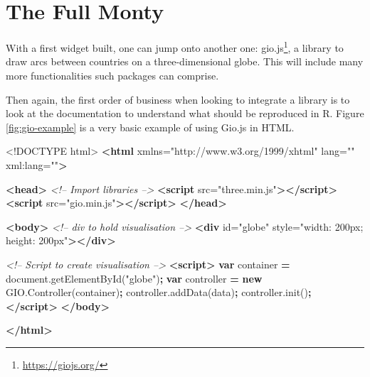 \documentclass[10pt,]{krantz}
\makeatletter
\newenvironment{Shaded}{\begin{snugshade}}{\end{snugshade}}
\newcommand{\AttributeTok}[1]{\textcolor[rgb]{0.61,0.61,0.61}{#1}}
\newcommand{\CommentTok}[1]{\textcolor[rgb]{0.37,0.37,0.37}{\textit{#1}}}
\newcommand{\DataTypeTok}[1]{\textcolor[rgb]{0.27,0.27,0.27}{#1}}
\newcommand{\KeywordTok}[1]{\textcolor[rgb]{0.27,0.27,0.27}{\textbf{#1}}}
\newcommand{\NormalTok}[1]{#1}
\newcommand{\OperatorTok}[1]{\textcolor[rgb]{0.43,0.43,0.43}{\textbf{#1}}}
\newcommand{\OtherTok}[1]{\textcolor[rgb]{0.37,0.37,0.37}{#1}}
\newcommand{\StringTok}[1]{\textcolor[rgb]{0.5,0.5,0.5}{#1}}
\newcommand{\VariableTok}[1]{\textcolor[rgb]{0,0,0}{#1}}
\renewcommand{\href}[2]{#2\footnote{\url{#1}}}
\newenvironment{kframe}{%
\medskip{}
\setlength{\fboxsep}{.8em}
 \def\at@end@of@kframe{}%
 \ifinner\ifhmode%
  \def\at@end@of@kframe{\end{minipage}}%
  \begin{minipage}{\columnwidth}%
 \fi\fi%
 \def\FrameCommand##1{\hskip\@totalleftmargin \hskip-\fboxsep
 \colorbox{shadecolor}{##1}\hskip-\fboxsep
     \hskip-\linewidth \hskip-\@totalleftmargin \hskip\columnwidth}%
 \MakeFramed {\advance\hsize-\width
   \@totalleftmargin\z@ \linewidth\hsize
   \@setminipage}}%
 {\par\unskip\endMakeFramed%
 \at@end@of@kframe}
\renewenvironment{Shaded}{\begin{kframe}}{\end{kframe}}
\makeatother
\begin{document}
\hypertarget{widgets-full}{%
\chapter{The Full Monty}\label{widgets-full}}

With a first widget built, one can jump onto another one: \href{https://giojs.org/}{gio.js}, a library to draw arcs between countries on a three-dimensional globe. This will include many more functionalities such packages can comprise.

Then again, the first order of business when looking to integrate a library is to look at the documentation to understand what should be reproduced in R. Figure \ref{fig:gio-example} is a very basic example of using Gio.js in HTML.

\begin{Shaded}
\begin{Highlighting}[]
\DataTypeTok{<!DOCTYPE }\NormalTok{html}\DataTypeTok{>}
\KeywordTok{<html}\OtherTok{ xmlns=}\StringTok{"http://www.w3.org/1999/xhtml"}\OtherTok{ lang=}\StringTok{""}\OtherTok{ xml:lang=}\StringTok{""}\KeywordTok{>}

\KeywordTok{<head>}
  \CommentTok{<!-- Import libraries -->}
  \KeywordTok{<script}\OtherTok{ src=}\StringTok{"three.min.js"}\KeywordTok{></script>}
  \KeywordTok{<script}\OtherTok{ src=}\StringTok{"gio.min.js"}\KeywordTok{></script>}
\KeywordTok{</head>}

\KeywordTok{<body>}
  \CommentTok{<!-- div to hold visualisation -->}
  \KeywordTok{<div}\OtherTok{ id=}\StringTok{"globe"}\OtherTok{ style=}\StringTok{"width: 200px; height: 200px"}\KeywordTok{></div>}

  \CommentTok{<!-- Script to create visualisation -->}
  \KeywordTok{<script>}
    \KeywordTok{var}\NormalTok{ container }\OperatorTok{=} \VariableTok{document}\NormalTok{.}\AttributeTok{getElementById}\NormalTok{(}\StringTok{"globe"}\NormalTok{)}\OperatorTok{;}
    \KeywordTok{var}\NormalTok{ controller }\OperatorTok{=} \KeywordTok{new} \VariableTok{GIO}\NormalTok{.}\AttributeTok{Controller}\NormalTok{(container)}\OperatorTok{;}
    \VariableTok{controller}\NormalTok{.}\AttributeTok{addData}\NormalTok{(data)}\OperatorTok{;}
    \VariableTok{controller}\NormalTok{.}\AttributeTok{init}\NormalTok{()}\OperatorTok{;}
  \KeywordTok{</script>}
\KeywordTok{</body>}

\KeywordTok{</html>}
\end{Highlighting}
\end{Shaded}
\end{document}
